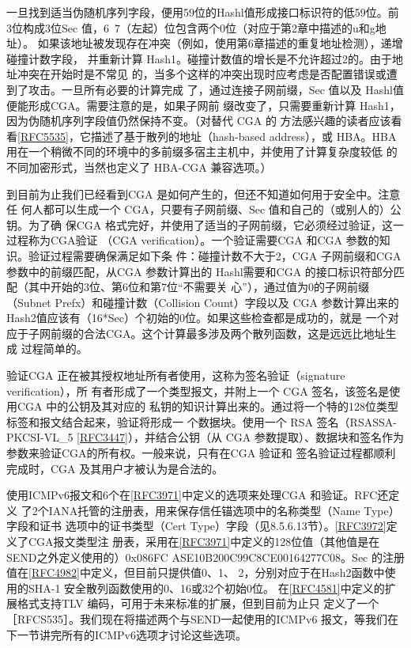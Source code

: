 一旦找到适当伪随机序列字段，便用59位的Hashl值形成接口标识符的低59位。前
3位构成3位Sec 值，6~7（左起）位包含两个0位（对应于第2章中描述的u和g地址）。
如果该地址被发现存在冲突（例如，使用第6章描述的重复地址检测），递增碰撞计数字段，
并重新计算 Hash1。碰撞计数值的增长是不允许超过2的。由于地址冲突在开始时是不常见
的，当多个这样的冲突出现时应考虑是否配置错误或遭到了攻击。一旦所有必要的计算完成
了，通过连接子网前缀，Sec 值以及 Hashl值便能形成CGA。需要注意的是，如果子网前
缀改变了，只需要重新计算 Hash1，因为伪随机序列字段值仍然保持不变。（对替代 CGA 的
方法感兴趣的读者应该看看\href{https://www.rfc-editor.org/rfc/rfc5535}{[RFC5535]}，它描述了基于散列的地址（hash-based
address），或
HBA。HBA 用在一个稍微不同的环境中的多前缀多宿主主机中，并使用了计算复杂度较低
的不同加密形式，当然也定义了 HBA-CGA 兼容选项。）

到目前为止我们已经看到CGA 是如何产生的，但还不知道如何用于安全中。注意任
何人都可以生成一个 CGA，只要有子网前缀、Sec 值和自己的（或别人的）公钥。为了确
保CGA 格式完好，并使用了适当的子网前缀，它必须经过验证，这一过程称为CGA验证
（CGA verification）。一个验证需要CGA 和CGA 参数的知识。验证过程需要确保满足如下条
件：碰撞计数不大于2，CGA 子网前缀和CGA 参数中的前缀匹配，从CGA 参数计算出的
Hashl需要和CGA 的接口标识符部分匹配（其中开始的3位、第6位和第7位“不需要关
心”），通过值为0的子网前缀（Subnet Prefx）和碰撞计数（Collision Count）字段以及 CGA
参数计算出来的 Hash2值应该有（16*Sec）个初始的0位。如果这些检查都是成功的，就是
一个对应于子网前缀的合法CGA。这个计算最多涉及两个散列函数，这是远远比地址生成
过程简单的。

验证CGA 正在被其授权地址所有者使用，这称为签名验证（signature verification），所
有者形成了一个类型报文，并附上一个 CGA 签名，该签名是使用CGA 中的公钥及其对应的
私钥的知识计算出来的。通过将一个特的128位类型标签和报文结合起来，验证将形成一
个数据块。使用一个 RSA 签名（RSASSA-PKCSI-VL\_5
\href{https://www.rfc-editor.org/rfc/rfc3447}{[RFC3447]}），并结合公钥（从 CGA
参数提取）、数据块和签名作为参数来验证CGA的所有权。一般来说，只有在CGA 验证和
签名验证过程都顺利完成时，CGA 及其用户才被认为是合法的。

使用ICMPv6报文和6个在\href{https://www.rfc-editor.org/rfc/rfc3971}{[RFC3971]}中定义的选项来处理CGA
和验证。RFC还定义
了2个IANA托管的注册表，用来保存信任锚选项中的名称类型（Name Type）字段和证书
选项中的证书类型（Cert
Type）字段（见8.5.6.13节）。\href{https://www.rfc-editor.org/rfc/rfc3972}{[RFC3972]}定义了CGA报文类型注
册表，采用在\href{https://www.rfc-editor.org/rfc/rfc3971}{[RFC3971]}中定义的128位值（其他值是在SEND之外定义使用的）0x086FC
ASE10B200C99C8CE00164277C08。Sec
的注册值在\href{https://www.rfc-editor.org/rfc/rfc4982}{[RFC4982]}中定义，但目前只提供值0、1、
2，分别对应于在Hash2函数中使用的SHA-1 安全散列函数使用的0、16或32个初始0位。
在\href{https://www.rfc-editor.org/rfc/rfc4581}{[RFC4581]}中定义的扩展格式支持TLV
编码，可用于未来标准的扩展，但到目前为止只
定义了一个［RFCS535］。我们现在将描述两个与SEND一起使用的ICMPv6 报文，等我们在
下一节讲完所有的ICMPv6选项才讨论这些选项。

